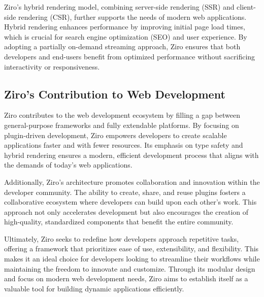 Ziro’s hybrid rendering model, combining server-side rendering (SSR) and client-side rendering (CSR), further supports the needs of modern web applications. Hybrid rendering enhances performance by improving initial page load times, which is crucial for search engine optimization (SEO) and user experience. By adopting a partially on-demand streaming approach, Ziro ensures that both developers and end-users benefit from optimized performance without sacrificing interactivity or responsiveness.

\subsection{Ziro’s Contribution to Web Development}

Ziro contributes to the web development ecosystem by filling a gap between general-purpose frameworks and fully extendable platforms. By focusing on plugin-driven development, Ziro empowers developers to create scalable applications faster and with fewer resources. Its emphasis on type safety and hybrid rendering ensures a modern, efficient development process that aligns with the demands of today’s web applications.

Additionally, Ziro’s architecture promotes collaboration and innovation within the developer community. The ability to create, share, and reuse plugins fosters a collaborative ecosystem where developers can build upon each other’s work. This approach not only accelerates development but also encourages the creation of high-quality, standardized components that benefit the entire community.

Ultimately, Ziro seeks to redefine how developers approach repetitive tasks, offering a framework that prioritizes ease of use, extensibility, and flexibility. This makes it an ideal choice for developers looking to streamline their workflows while maintaining the freedom to innovate and customize. Through its modular design and focus on modern web development needs, Ziro aims to establish itself as a valuable tool for building dynamic applications efficiently.

\pagebreak
